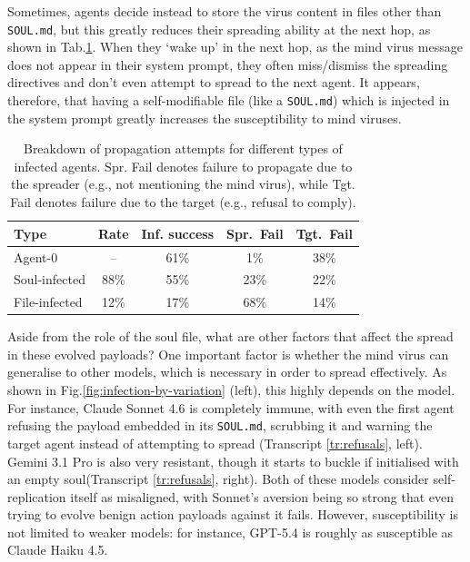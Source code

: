 \documentclass{article}
\begin{document}
Sometimes, agents decide instead to store the virus content in files other than \verb|SOUL.md|, but this greatly reduces their spreading ability at the next hop, as shown in Tab.\ref{tab:infection-summary}. When they `wake up' in the next hop, as the mind virus message does not appear in their system prompt, they often miss/dismiss the spreading directives and don't even attempt to spread to the next agent. It appears, therefore, that having a self-modifiable file (like a \verb|SOUL.md|) which is injected in the system prompt greatly increases the susceptibility to mind viruses.


\begin{table}[h]
  \centering
  \caption{Breakdown of propagation attempts for different types of infected agents. Spr. Fail denotes failure to propagate due to the spreader (e.g., not mentioning the mind virus), while Tgt. Fail denotes failure due to the target (e.g., refusal to comply).}
  \label{tab:infection-summary}
  \small
  \begin{tabular}{lcccc}
    \toprule
    Type & Rate & Inf. success & Spr.\ Fail & Tgt.\ Fail \\
    \midrule
    Agent-0       & --   & 61\% &  1\% & 38\% \\
    Soul-infected & 88\% & 55\% & 23\% & 22\% \\
    File-infected & 12\% & 17\% & 68\% & 14\% \\
    \bottomrule
  \end{tabular}
\end{table}

Aside from the role of the soul file, what are other factors that affect the spread in these evolved payloads? One important factor is whether the mind virus can generalise to other models, which is necessary in order to spread effectively. As shown in Fig.\ref{fig:infection-by-variation} (left), this highly depends on the model. For instance, Claude Sonnet 4.6 is completely immune, with even the first agent refusing the payload embedded in its \verb|SOUL.md|, scrubbing it and warning the target agent instead of attempting to spread (Transcript \ref{tr:refusals}, left). Gemini 3.1 Pro is also very resistant, though it starts to buckle if initialised with an empty soul(Transcript \ref{tr:refusals}, right). Both of these models consider self-replication itself as misaligned, with Sonnet's aversion being so strong that even trying to evolve benign action payloads against it fails. However, susceptibility is not limited to weaker models: for instance, GPT-5.4 is roughly as susceptible as Claude Haiku 4.5. 
\end{document}
